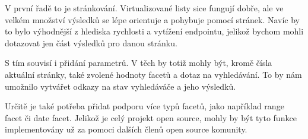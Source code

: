 V první řadě to je stránkování. 
Virtualizované listy sice fungují dobře, ale ve velkém množství výsledků se lépe orientuje a pohybuje pomocí stránek.
Navíc by to bylo výhodnější z hlediska rychlosti a vytížení  endpointu, jelikož bychom mohli dotazovat jen část výsledků pro danou stránku.

S tím souvisí i přidání  parametrů. 
V těch by totiž mohly být, kromě čísla aktuální stránky, také zvolené hodnoty facetů a dotaz na vyhledávání.
To by nám umožnilo vytvářet odkazy na stav vyhledáváče a jeho výsledků.

Určitě je také potřeba přidat podporu více typů facetů, jako například range facet či date facet. 
Jelikož je celý projekt open source, mohly by být tyto funkce implementovány už za pomoci dalších členů open source komunity.
